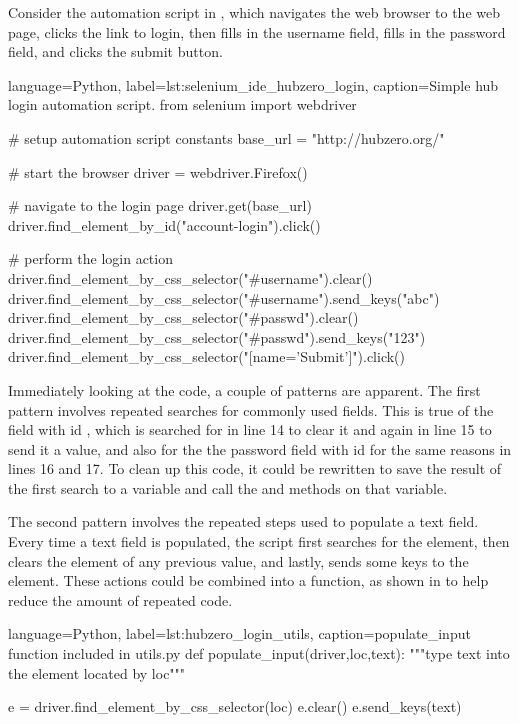 Consider the automation script in ,
which navigates the web browser to the  web page,
clicks the link to login, then fills in the username field, fills in the
password field, and clicks the submit button.

\begin{xcode}{%
  language=Python,%
  label=lst:selenium_ide_hubzero_login,%
  caption={Simple hub login automation script.}%
}
from selenium import webdriver

# setup automation script constants
base_url = "http://hubzero.org/"

# start the browser
driver = webdriver.Firefox()

# navigate to the login page
driver.get(base_url)
driver.find_element_by_id("account-login").click()

# perform the login action
driver.find_element_by_css_selector("#username").clear()
driver.find_element_by_css_selector("#username").send_keys("abc")
driver.find_element_by_css_selector("#passwd").clear()
driver.find_element_by_css_selector("#passwd").send_keys("123")
driver.find_element_by_css_selector("[name='Submit']").click()
\end{xcode}


\noindent

Immediately looking at the code, a couple of patterns are apparent.  The first
pattern involves repeated searches for commonly used fields. This is true of
the field with id , which is searched for in line 14 to clear
it and again in line 15 to send it a value, and also for the the password field
with id  for the same reasons in lines 16 and 17.  To clean up
this code, it could be rewritten to save the result of the first search to
a variable and call the  and  methods on
that variable.

The second pattern involves the repeated steps used to populate a text field.
Every time a text field is populated, the script first searches for the
element, then clears the element of any previous value, and lastly, sends some
keys to the element. These actions could be combined into a function, as shown
in  to help reduce the amount of repeated
code.

\begin{xcode}{%
  language=Python,%
  label=lst:hubzero_login_utils,%
  caption={populate\_input function included in utils.py}%
}
def populate_input(driver,loc,text):
  """type text into the element located by loc"""

  e = driver.find_element_by_css_selector(loc)
  e.clear()
  e.send_keys(text)
\end{xcode}

